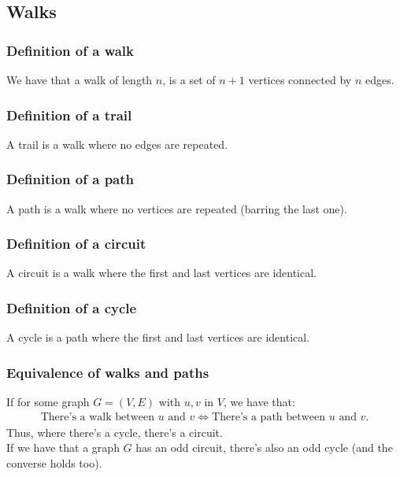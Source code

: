 \documentclass[a4paper, 12pt, twoside]{article}
\begin{document}
\subsection{Walks}

\subsubsection{Definition of a walk}

We have that a walk of length $n$, is a set of
$n + 1$ vertices connected by $n$ edges.

\subsubsection{Definition of a trail}

A trail is a walk where no edges are repeated.

\subsubsection{Definition of a path}

A path is a walk where no vertices are repeated (barring the 
last one).

\subsubsection{Definition of a circuit}

A circuit is a walk where the first and last vertices are identical.

\subsubsection{Definition of a cycle}

A cycle is a path where the first and last vertices are identical.

\subsubsection{Equivalence of walks and paths}

If for some graph $G = (V, E)$ with $u, v$ in $V$, we have that:
\begin{gather*}
  \text{There's a walk between } u \text{ and } v
  \Longleftrightarrow
  \text{There's a path between } u \text{ and } v.
\end{gather*} Thus, where there's a cycle, there's a circuit.
\\[\baselineskip]
If we have that a graph $G$ has an odd circuit, there's also
an odd cycle (and the converse holds too).
\end{document}
